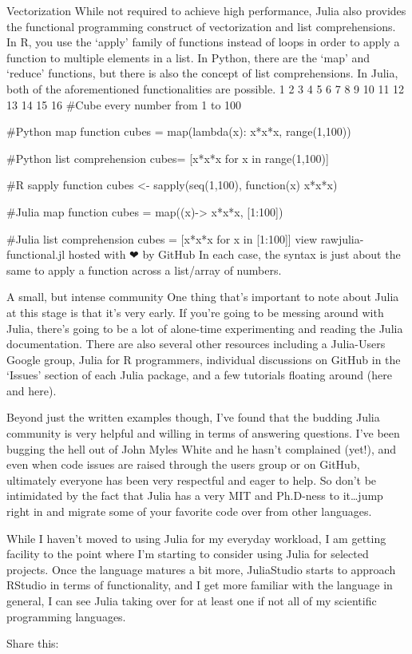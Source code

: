 Vectorization
While not required to achieve high performance, Julia also provides the functional programming construct of vectorization and list comprehensions. In R, you use the ‘apply’ family of functions instead of loops in order to apply a function to multiple elements in a list. In Python, there are the ‘map’ and ‘reduce’ functions, but there is also the concept of list comprehensions. In Julia, both of the aforementioned functionalities are possible.
1
2
3
4
5
6
7
8
9
10
11
12
13
14
15
16
#Cube every number from 1 to 100
 
#Python map function 
cubes = map(lambda(x): x*x*x, range(1,100))
 
#Python list comprehension
cubes= [x*x*x for x in range(1,100)]
 
#R sapply function
cubes <- sapply(seq(1,100), function(x) x*x*x)
 
#Julia map function
cubes = map((x)-> x*x*x, [1:100])
 
#Julia list comprehension
cubes = [x*x*x for x in [1:100]]
view rawjulia-functional.jl hosted with ❤ by GitHub
In each case, the syntax is just about the same to apply a function across a list/array of numbers.



 

A small, but intense community
One thing that’s important to note about Julia at this stage is that it’s very early. If you’re going to be messing around with Julia, there’s going to be a lot of alone-time experimenting and reading the Julia documentation. There are also several other resources including a Julia-Users Google group, Julia for R programmers, individual discussions on GitHub in the ‘Issues’ section of each Julia package, and a few tutorials floating around (here and here).

Beyond just the written examples though, I’ve found that the budding Julia community is very helpful and willing in terms of answering questions. I’ve been bugging the hell out of John Myles White and he hasn’t complained (yet!), and even when code issues are raised through the users group or on GitHub, ultimately everyone has been very respectful and eager to help. So don’t be intimidated by the fact that Julia has a very MIT and Ph.D-ness to it…jump right in and migrate some of your favorite code over from other languages.

While I haven’t moved to using Julia for my everyday workload, I am getting facility to the point where I’m starting to consider using Julia for selected projects. Once the language matures a bit more, JuliaStudio starts to approach RStudio in terms of functionality, and I get more familiar with the language in general, I can see Julia taking over for at least one if not all of my scientific programming languages.

Share this:
